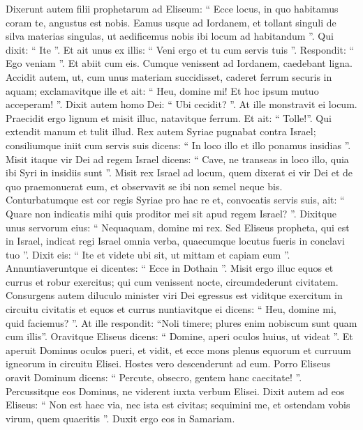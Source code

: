 \begin{biblechapter}
\begin{biblechapter}
\begin{biblechapter}
\begin{biblechapter}
\begin{biblechapter}
\begin{biblechapter}
 \verse Dixerunt autem filii prophetarum ad Eliseum: “ Ecce locus, in quo habitamus coram te, angustus est nobis. 
\verse Eamus usque ad Iordanem, et tollant singuli de silva materias singulas, ut aedificemus nobis ibi locum ad habitandum ”. Qui dixit: “ Ite ”. 
\verse Et ait unus ex illis: “ Veni ergo et tu cum servis tuis ”. Respondit: “ Ego veniam ”. 
\verse Et abiit cum eis. Cumque venissent ad Iordanem, caedebant ligna. 
\verse Accidit autem, ut, cum unus materiam succidisset, caderet ferrum securis in aquam; exclamavitque ille et ait: “ Heu, domine mi! Et hoc ipsum mutuo acceperam! ”. 
\verse Dixit autem homo Dei: “ Ubi cecidit? ”. At ille monstravit ei locum. Praecidit ergo lignum et misit illuc, natavitque ferrum. 
 \verse Et ait: “ Tolle!”. Qui extendit manum et tulit illud.
 \verse Rex autem Syriae pugnabat contra Israel; consiliumque iniit cum servis suis dicens: “ In loco illo et illo ponamus insidias ”. 
\verse Misit itaque vir Dei ad regem Israel dicens: “ Cave, ne transeas in loco illo, quia ibi Syri in insidiis sunt ”. 
\verse Misit rex Israel ad locum, quem dixerat ei vir Dei et de quo praemonuerat eum, et observavit se ibi non semel neque bis.
 \verse Conturbatumque est cor regis Syriae pro hac re et, convocatis servis suis, ait: “ Quare non indicatis mihi quis proditor mei sit apud regem Israel? ”. 
\verse Dixitque unus servorum eius: “ Nequaquam, domine mi rex. Sed Eliseus propheta, qui est in Israel, indicat regi Israel omnia verba, quaecumque locutus fueris in conclavi tuo ”. 
\verse Dixit eis: “ Ite et videte ubi sit, ut mittam et capiam eum ”. Annuntiaveruntque ei dicentes: “ Ecce in Dothain ”. 
\verse Misit ergo illuc equos et currus et robur exercitus; qui cum venissent nocte, circumdederunt civitatem.
 \verse Consurgens autem diluculo minister viri Dei egressus est viditque exercitum in circuitu civitatis et equos et currus nuntiavitque ei dicens: “ Heu, domine mi, quid faciemus? ”. 
\verse At ille respondit: “Noli timere; plures enim nobiscum sunt quam cum illis”. 
\verse Oravitque Eliseus dicens: “ Domine, aperi oculos huius, ut videat ”. Et aperuit Dominus oculos pueri, et vidit, et ecce mons plenus equorum et curruum igneorum in circuitu Elisei.
 \verse Hostes vero descenderunt ad eum. Porro Eliseus oravit Dominum dicens: “ Percute, obsecro, gentem hanc caecitate! ”. Percussitque eos Dominus, ne viderent iuxta verbum Elisei. 
\verse Dixit autem ad eos Eliseus: “ Non est haec via, nec ista est civitas; sequimini me, et ostendam vobis virum, quem quaeritis ”. Duxit ergo eos in Samariam. 

\end{biblechapter}
\end{biblechapter}
\end{biblechapter}
\end{biblechapter}
\end{biblechapter}
\end{biblechapter}
